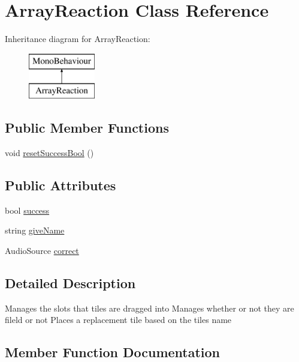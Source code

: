 \hypertarget{class_array_reaction}{}\section{Array\+Reaction Class Reference}
\label{class_array_reaction}
Inheritance diagram for Array\+Reaction\+:\begin{figure}[H]
\begin{center}
\leavevmode
\includegraphics[height=2.000000cm]{class_array_reaction}
\end{center}
\end{figure}
\subsection*{Public Member Functions}
\begin{DoxyCompactItemize}
\item 
void \hyperlink{class_array_reaction_ab805c31627d8e16a92813afad4a6e7bb}{reset\+Success\+Bool} ()
\end{DoxyCompactItemize}
\subsection*{Public Attributes}
\begin{DoxyCompactItemize}
\item 
bool \hyperlink{class_array_reaction_adf5df12cecfb640661571ae871e5be5d}{success}
\item 
string \hyperlink{class_array_reaction_aab057c39f78c1f0f9a2cacf8a7d23f6f}{give\+Name}
\item 
Audio\+Source \hyperlink{class_array_reaction_ad469f4e03562bf0773db8ca308997a10}{correct}
\end{DoxyCompactItemize}


\subsection{Detailed Description}
Manages the slots that tiles are dragged into Manages whether or not they are fileld or not Places a replacement tile based on the tile\textquotesingle{}s name 

\subsection{Member Function Documentation}
\mbox{\label{class_array_reaction_ab805c31627d8e16a92813afad4a6e7bb}} 
